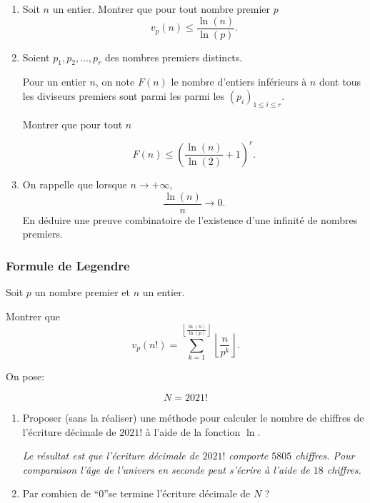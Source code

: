 \begin{exo}
    \begin{enumerate}
        \item Soit $n$ un entier. Montrer que pour tout nombre premier $p$
              \[v_p(n) \leq \frac{\ln(n)}{\ln(p)}.\]
        \item Soient $p_1, p_2, \ldots, p_r$ des nombres premiers distincts.

              Pour un entier $n$, on note $F(n)$ le nombre d'entiers inférieurs à $n$ dont tous les diviseurs premiers sont parmi les parmi les $(p_i)_{1 \leq i \leq r}$.

              Montrer que pour tout $n$

              \[F(n) \leq \left(\frac{\ln(n)}{\ln(2)}+1 \right)^r.\]
        \item On rappelle que lorsque $n \to + \infty$,
              \[\frac{\ln(n)}{n} \to 0.\]
              En déduire une preuve combinatoire de l'existence d'une infinité de nombres premiers.
    \end{enumerate}
\end{exo}

\subsubsection{Formule de Legendre}

\begin{exo}
    Soit $p$ un nombre premier et $n$ un entier.

    Montrer que
    \[v_p(n!) = \sum_{k=1}^{\left\lfloor \frac{\ln(n)}{\ln(p)} \right\rfloor} \left\lfloor \frac{n}{p^k} \right\rfloor.\]
\end{exo}

\begin{exo}
    On pose:

    \[N = 2021!\]
    \begin{enumerate}
        \item Proposer (sans la réaliser) une méthode pour calculer le nombre de chiffres de l'écriture décimale de $2021!$ à l'aide de la fonction $\ln$.

              \textit{\small Le résultat est que l'écriture décimale de $2021!$ comporte $5805$ chiffres. Pour comparaison l'âge de l'univers en seconde peut s'écrire à l'aide de $18$ chiffres.}

        \item Par combien de ``$0$''se termine l'écriture décimale de $N$  ?

    \end{enumerate}
\end{exo}


